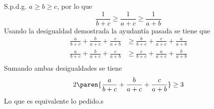 \documentclass{ayudantia}
\begin{document}
\begin{ans}
    \begin{sol}
        S.p.d.g. \(a\geq b\geq c\), por lo que
        \begin{equation*}
            \frac1{b+c}\geq\frac1{a+c}\geq\frac1{a+b}
        \end{equation*}
        Usando la desigualdad demostrada la ayudantía pasada se tiene que
        \begin{align*}
            \frac{a}{b+c}+\frac{b}{a+c}+\frac{c}{a+b} & \geq\frac{b}{b+c}+\frac{c}{a+c}+\frac{a}{a+b} \\
            \frac{a}{b+c}+\frac{b}{a+c}+\frac{c}{a+b} & \geq\frac{c}{b+c}+\frac{a}{a+c}+\frac{b}{a+b} \\
        \end{align*}
        Sumando ambas desigualdades se tiene
        \begin{equation*}
            2\paren{\frac{a}{b+c}+\frac{b}{a+c}+\frac{c}{a+b}}\geq3
        \end{equation*}
        Lo que es equivalente lo pedido.s
    \end{sol}
\end{ans}
\end{document}
